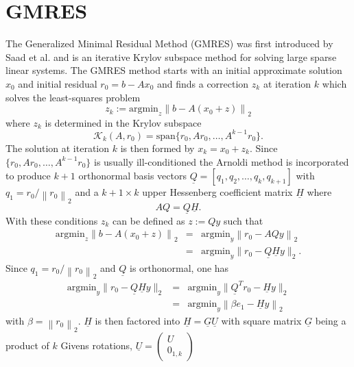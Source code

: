 \documentclass{scrartcl}
\numberwithin{equation}{section}
\newcommand{\norm}[1]{\left\lVert#1\right\rVert}
\begin{document}
\section{GMRES}
The Generalized Minimal Residual Method (GMRES) was first introduced by Saad et al. \cite{Saad:1986:GGM:14063.14074} and is an iterative Krylov subspace method for solving large sparse linear systems. 
The GMRES method starts with an initial approximate solution $x_0$ and initial residual $r_0 = b - Ax_0$ and finds a correction $z_k$ at iteration $k$ which solves the least-squares problem 
\begin{equation}
	z_k := \text{argmin}_{z} \norm{b - A(x_0 + z)}_2
\end{equation}
where $z_k$ is determined in the Krylov subspace 
\begin{equation*}
	 \mathcal{K}_k(A, r_0) = \text{span}\{r_0, Ar_0, \ldots, A^{k-1}r_0\}.
\end{equation*}
The solution at iteration $k$ is then formed by $x_k = x_0 + z_k$.
Since $\{r_0, Ar_0, \ldots, A^{k-1}r_0\}$ is usually ill-conditioned the Arnoldi method is incorporated to produce $k + 1$ orthonormal basis vectors $\underline{Q} = [q_1, q_2, \ldots, q_k, q_{k + 1}]$ with $q_1 = r_0/\norm{r_0}_2$ and a $k + 1 \times k$ upper Hessenberg coefficient matrix $\underline{H}$ where
\begin{equation*}
	AQ = \underline{Q}\underline{H}.
\end{equation*}
With these conditions $z_k$ can be defined as $z := Qy$ such that 
\begin{eqnarray*}
	\text{argmin}_{z} \norm{b - A(x_0 + z)}_2 &=& \text{argmin}_y \norm{r_0 - AQy}_2 \\
	 &=& \text{argmin}_{y} \lVert r_0 - \underline{Q} \underline{H} y \rVert_2.
\end{eqnarray*}
Since $q_1 = r_0/\norm{r_0}_2$ and $\underline{Q}$ is orthonormal, one has
\begin{eqnarray} \label{eq:stdgmreslsp}
	\text{argmin}_y \lVert r_0 - \underline{Q} \underline{H} y \rVert_2 &=& \text{argmin}_{y} \lVert \underline{Q}^T r_0 - \underline{H} y \rVert_2 \nonumber \\
	&=& \text{argmin}_{y} \norm{\beta e_1 - \underline{H} y}_2 
\end{eqnarray}
with $\beta = \norm{r_0}_2$.
$\underline{H}$ is then factored into $\underline{H} = \underline{G}\underline{U}$ with square matrix $\underline{G}$ being a product of $k$ Givens rotations, $\underline{U} = 
\begin{pmatrix}
	U \\
	0_{1, k}
\end{pmatrix}$
\end{document}
